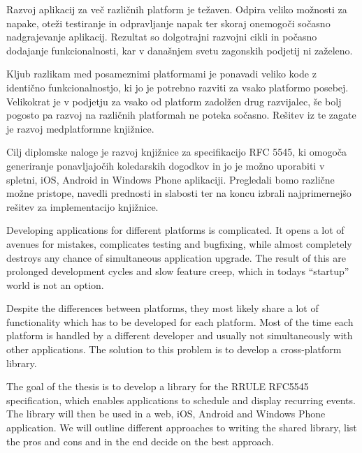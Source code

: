 





\begin{Povzetek}

Razvoj aplikacij za več različnih platform je težaven. Odpira veliko možnosti za napake, oteži testiranje in odpravljanje napak ter skoraj onemogoči sočasno nadgrajevanje aplikacij. Rezultat so dolgotrajni razvojni cikli in počasno dodajanje funkcionalnosti, kar v današnjem svetu zagonskih podjetij ni zaželeno.

Kljub razlikam med posameznimi platformami je ponavadi veliko kode z identično funkcionalnostjo, ki jo je potrebno razviti za vsako platformo posebej. Velikokrat je v podjetju za vsako od platform zadolžen drug razvijalec, še bolj pogosto pa razvoj na različnih platformah ne poteka sočasno. Rešitev iz te zagate je razvoj medplatformne knjižnice.

Cilj diplomske naloge je razvoj knjižnice za specifikacijo RFC 5545, ki omogoča generiranje ponavljajočih koledarskih dogodkov in jo je možno uporabiti v spletni, iOS, Android in Windows Phone aplikaciji. Pregledali bomo različne možne pristope, navedli prednosti in slabosti ter na koncu izbrali najprimernejšo rešitev za implementacijo knjižnice.
\end{Povzetek}









\begin{Abstract}

Developing applications for different platforms is complicated. It opens a lot of avenues for mistakes, complicates testing and bugfixing, while almost completely destroys any chance of simultaneous application upgrade. The result of this are prolonged development cycles and slow feature creep, which in todays ``startup'' world is not an option.

Despite the differences between platforms, they most likely share a lot of functionality which has to be developed for each platform. Most of the time each platform is handled by a different developer and usually not simultaneously with other applications. The solution to this problem is to develop a cross-platform library.

The goal of the thesis is to develop a library for the RRULE RFC5545 specification, which enables applications to schedule and display recurring events. The library will then be used in a web, iOS, Android and Windows Phone application. We will outline different approaches to writing the shared library, list the pros and cons and in the end decide on the best approach.
\end{Abstract}
